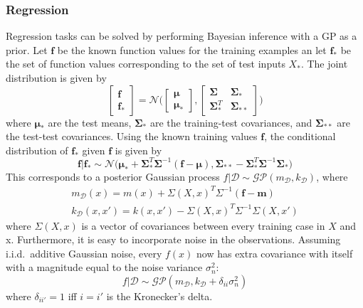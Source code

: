 \documentclass{article}
\begin{document}
\subsubsection{Regression}
Regression tasks can be solved by performing Bayesian inference with a GP as a prior. Let $\mathbf{f}$ be the known function values for the training examples an let $\mathbf{f}_*$ be the set of function values corresponding to the set of test inputs $X_*$. The joint distribution is given by
\begin{equation*}
\begin{bmatrix} \mathbf{f} \\ \mathbf{f}_* \end{bmatrix} 
= 
\mathcal{N}\Big(\begin{bmatrix} \bm{\mu} \\ \bm{\mu}_* \end{bmatrix}, \begin{bmatrix}\bm{\Sigma} & \bm{\Sigma}_* \\ \bm{\Sigma}_*^T & \bm{\Sigma}_{**} \end{bmatrix} \Big)
\end{equation*}
where $\bm{\mu}_*$ are the test means, $\bm{\Sigma}_*$ are the training-test covariances, and $\bm{\Sigma}_{**}$ are the test-test covariances. Using the known training values $\mathbf{f}$, the conditional distribution of $\mathbf{f}_*$ given $\mathbf{f}$ is given by
\begin{equation*}
	\mathbf{f} \big\vert \mathbf{f}_* \sim
	\mathcal{N} \big( \bm{\mu}_* + \mathbf{\Sigma}_*^T \mathbf{\Sigma}^{-1}(\mathbf{f}-\bm{\mu}), \mathbf{\Sigma}_{**} - \mathbf{\Sigma}^T_*\mathbf{\Sigma}^{-1}\mathbf{\Sigma}_* \big)
\end{equation*}
This corresponds to a posterior Gaussian process $f \big\vert \mathcal{D} \sim \mathcal{GP}(m_\mathcal{D}, k_\mathcal{D})$, where
\begin{align*}
	 m_\mathcal{D}(x) = m(x) + \Sigma(X,x)^T\Sigma^{-1}(\mathbf{f}-\mathbf{m})\\
	k_\mathcal{D}(x, x') = k(x, x') - \Sigma(X,x)^T\Sigma^{-1}\Sigma(X, x')
\end{align*}
where $\Sigma(X, x)$ is a vector of covariances between every training case in $X$ and x. Furthermore, it is easy to incorporate noise in the observations. Assuming i.i.d.\ additive Gaussian noise, every $f(x)$ now has extra covariance with itself with a magnitude equal to the noise variance $\sigma_n^2$:
\begin{equation*}
	f \big\vert \mathcal{D} \sim \mathcal{GP}(m_\mathcal{D}, k_\mathcal{D} + \delta_{ii} \sigma_n^2)
\end{equation*}
where $\delta_{ii'} = 1$ iff $i=i'$ is the Kronecker's delta.
\end{document}
